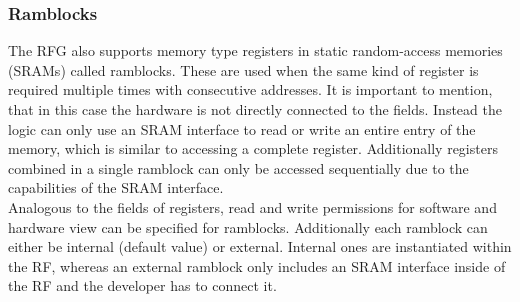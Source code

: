 \subsubsection{Ramblocks}\label{section::ramblocks}
The RFG also supports memory type registers in static random-access memories (SRAMs) called ramblocks. These are used when the same kind of register is required multiple times with consecutive addresses. It is important to mention, that in this case the hardware is not directly connected to the fields. Instead the logic can only use an SRAM interface to read or write an entire entry of the memory, which is similar to accessing a complete register. Additionally registers combined in a single ramblock can only be accessed sequentially due to the capabilities of the SRAM interface.\\
Analogous to the fields of registers, read and write permissions for software and hardware view can be specified for ramblocks. Additionally each ramblock can either be internal (default value) or external. Internal ones are instantiated within the RF, whereas an external ramblock only includes an SRAM interface inside of the RF and the developer has to connect it.
